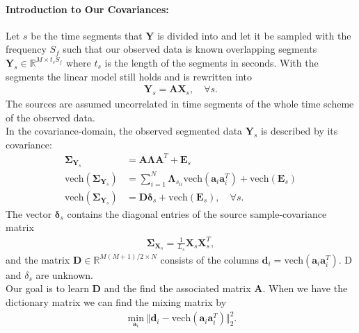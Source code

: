 \paragraph{Introduction to Our Covariances:}
Let $s$ be the time segments that $\mathbf{Y}$ is divided into and let it be sampled with the frequency $S_f$ such that our observed data is known overlapping segments $\mathbf{Y}_s \in \mathbb{R}^{M \times t_s S_f}$ where $t_s$ is the length of the segments in seconds. With the segments the linear model still holds and is rewritten into
\begin{align*}
\mathbf{Y}_s = \mathbf{AX}_s, \quad \forall s.
\end{align*}
The sources are assumed uncorrelated in time segments of the whole time scheme of the observed data. 
\\
In the covariance-domain, the observed segmented data $\mathbf{Y}_s$ is described by its covariance:
\begin{align*}
\boldsymbol{\Sigma}_{\mathbf{Y}_s} &= \mathbf{A} \boldsymbol{\Lambda} \mathbf{A}^T + \mathbf{E}_s \\
\text{vech}(\boldsymbol{\Sigma}_{\mathbf{Y}_s}) &= \sum_{i=1}^N \boldsymbol{\Lambda}_{s_{ii}} \text{vech}(\mathbf{a}_i \mathbf{a}_i^T) + \text{vech}(\mathbf{E}_s) \\
\text{vech}(\boldsymbol{\Sigma}_{\mathbf{Y}_s}) &= \mathbf{D} \boldsymbol{\delta}_s + \text{vech}(\mathbf{E}_s), \quad \forall s.
\end{align*}
The vector $\boldsymbol{\delta}_s$ contains the diagonal entries of the source sample-covariance matrix
\begin{align*}
\boldsymbol{\Sigma}_{\mathbf{X}_s} = \frac{1}{L_s} \mathbf{X}_s \mathbf{X}_s^T,
\end{align*}
and the matrix $\mathbf{D} \in \mathbb{R}^{M(M+1)/2 \times N}$ consists of the columns $\mathbf{d}_i = \text{vech}(\mathbf{a}_i \mathbf{a}_i^T)$. D and $\delta_s$ are unknown.
\\
Our goal is to learn $\mathbf{D}$ and the find the associated matrix $\mathbf{A}$. When we have the dictionary matrix we can find  the mixing matrix by
\begin{align*}
\min_{\mathbf{a}_i} \Vert \mathbf{d}_i - \text{vech}(\mathbf{a}_i \mathbf{a}_i^T) \Vert_2^2.
\end{align*}




